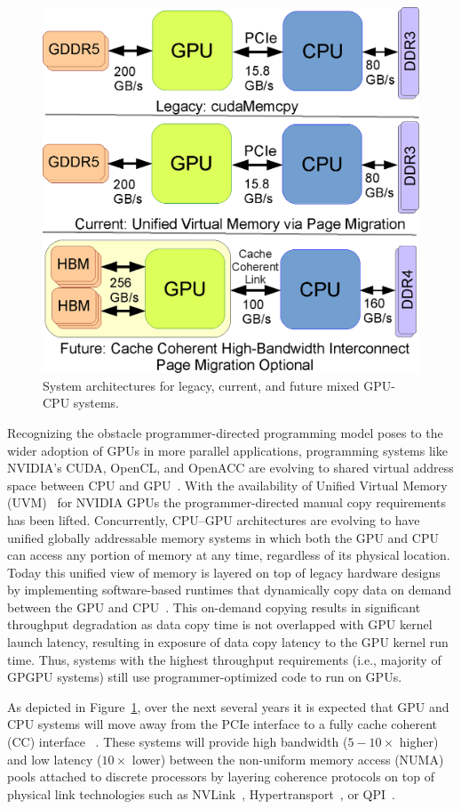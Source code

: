 \begin{figure}[t]
    \centering
    \includegraphics[width=0.7\columnwidth]{hpca2015/figures/architecture.eps}
    \caption{System architectures for legacy, current, and future mixed GPU-CPU systems.}
    \label{fig:arch-hpca2015}
\end{figure}

Recognizing the obstacle programmer-directed programming model poses to the
wider adoption of GPUs in more parallel applications, programming systems like
NVIDIA's CUDA, OpenCL, and OpenACC are evolving to shared virtual address space
between CPU and GPU~\cite{UVM}. With the availability of Unified Virtual Memory
(UVM)~\cite{UVM} for NVIDIA GPUs the programmer-directed manual copy
requirements has been lifted.  Concurrently, CPU--GPU architectures are evolving
to have unified globally addressable memory systems in which both the GPU and
CPU can access any portion of memory at any time, regardless of its physical
location.  Today this unified view of memory is layered on top of legacy
hardware designs by implementing software-based runtimes that dynamically copy
data on demand between the GPU and CPU~\cite{cuda}. This on-demand copying results in significant
throughput degradation as data copy time is not overlapped with GPU kernel
launch latency, resulting in exposure of data copy latency to the GPU kernel run
time. Thus, systems with the highest throughput requirements (i.e., majority of
GPGPU systems) still use programmer-optimized code to run on GPUs.

As depicted in Figure~\ref{fig:arch-hpca2015}, over the next several years it is
expected that GPU and CPU systems will move away from the PCIe interface to a
fully cache coherent (CC) interface ~\cite{AMDHSA}. These systems will provide
high bandwidth ($5-10\times$ higher) and low latency ($10\times$ lower) between
the non-uniform memory access (NUMA) pools attached to discrete processors by
layering coherence protocols on top of physical link technologies such as
NVLink~\cite{NVLINK}, Hypertransport~\cite{AMDHT}, or QPI~\cite{INTELQPI}.

